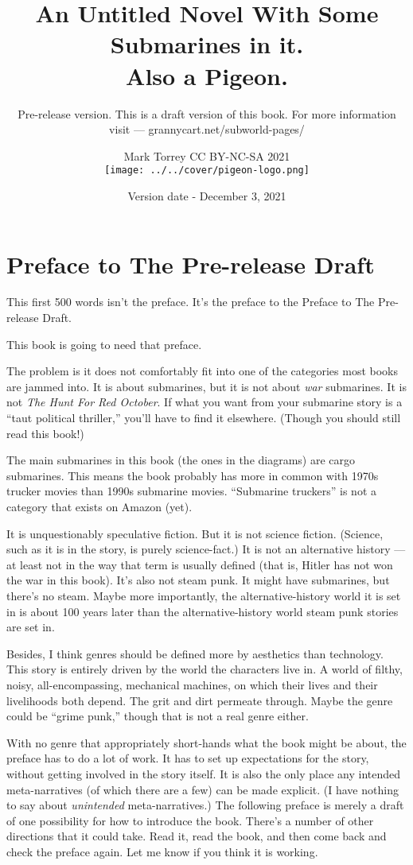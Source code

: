 \documentclass[]{scrbook}
\title{An Untitled Novel With Some Submarines in it.\\ Also a Pigeon.}
\subtitle{Pre-release version. This is a draft version of this book. For more
information visit --- grannycart.net/subworld-pages/}
\author{Mark Torrey CC BY-NC-SA 2021\\[5mm] \texttt{[image: ../../cover/pigeon-logo.png]}}
\date{Version date - December 3, 2021}
\begin{document}
\maketitle

\small
\hypertarget{preface-to-the-pre-release-draft}{%
\chapter*{Preface to The Pre-release
Draft}\label{preface-to-the-pre-release-draft}}

This first 500 words isn't the preface. It's the preface to the Preface
to The Pre-release Draft.

This book is going to need that preface.

The problem is it does not comfortably fit into one of the categories
most books are jammed into. It is about submarines, but it is not about
\emph{war} submarines. It is not \emph{The Hunt For Red October}. If
what you want from your submarine story is a ``taut political
thriller,'' you'll have to find it elsewhere. (Though you should still
read this book!)

The main submarines in this book (the ones in the diagrams) are cargo
submarines. This means the book probably has more in common with 1970s
trucker movies than 1990s submarine movies. ``Submarine truckers'' is
not a category that exists on Amazon (yet).

It is unquestionably speculative fiction. But it is not science fiction.
(Science, such as it is in the story, is purely science-fact.) It is not
an alternative history --- at least not in the way that term is usually
defined (that is, Hitler has not won the war in this book). It's also
not steam punk. It might have submarines, but there's no steam. Maybe
more importantly, the alternative-history world it is set in is about
100 years later than the alternative-history world steam punk stories
are set in.

Besides, I think genres should be defined more by aesthetics than
technology. This story is entirely driven by the world the characters
live in. A world of filthy, noisy, all-encompassing, mechanical
machines, on which their lives and their livelihoods both depend. The
grit and dirt permeate through. Maybe the genre could be ``grime punk,''
though that is not a real genre either.

With no genre that appropriately short-hands what the book might be
about, the preface has to do a lot of work. It has to set up
expectations for the story, without getting involved in the story
itself. It is also the only place any intended meta-narratives (of which
there are a few) can be made explicit. (I have nothing to say about
\emph{unintended} meta-narratives.) The following preface is merely a
draft of one possibility for how to introduce the book. There's a number
of other directions that it could take. Read it, read the book, and then
come back and check the preface again. Let me know if you think it is
working.
\end{document}
